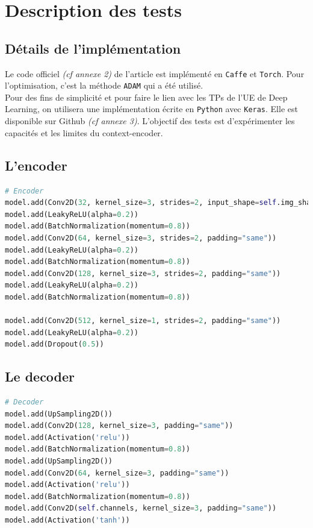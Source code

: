 \documentclass[11pt,a4paper]{article}
\begin{document}
            
    \section{Description des tests}
        \subsection{Détails de l'implémentation}
            Le code officiel \emph{(cf annexe 2)} de l’article est implémenté en \texttt{Caffe} et \texttt{Torch}. Pour l’optimisation, c’est la méthode \texttt{ADAM} qui a été utilisé.\\
            Pour des fins de simplicité et pour faire le lien avec les TPs de l’UE de Deep Learning, on utilisera une implémentation écrite en \texttt{Python} avec \texttt{Keras}. Elle est disponible sur Github \emph{(cf annexe 3)}. L'objectif des tests est d’expérimenter les capacités et les limites du context-encoder.
            
        \subsection{L'encoder}                
            \begin{lstlisting}[language=Python, caption=Code Python de l'encoder]
# Encoder
model.add(Conv2D(32, kernel_size=3, strides=2, input_shape=self.img_shape, https://www.xm1math.net/doculatex/listes.htmlpadding="same"))
model.add(LeakyReLU(alpha=0.2))
model.add(BatchNormalization(momentum=0.8))
model.add(Conv2D(64, kernel_size=3, strides=2, padding="same"))
model.add(LeakyReLU(alpha=0.2))
model.add(BatchNormalization(momentum=0.8))
model.add(Conv2D(128, kernel_size=3, strides=2, padding="same"))
model.add(LeakyReLU(alpha=0.2))
model.add(BatchNormalization(momentum=0.8))

model.add(Conv2D(512, kernel_size=1, strides=2, padding="same"))
model.add(LeakyReLU(alpha=0.2))
model.add(Dropout(0.5)) \end{lstlisting}
        
        \subsection{Le decoder}              
            \begin{lstlisting}[language=Python, caption=Code Python du decoder]
# Decoder
model.add(UpSampling2D())
model.add(Conv2D(128, kernel_size=3, padding="same"))
model.add(Activation('relu'))
model.add(BatchNormalization(momentum=0.8))
model.add(UpSampling2D())
model.add(Conv2D(64, kernel_size=3, padding="same"))
model.add(Activation('relu'))
model.add(BatchNormalization(momentum=0.8))
model.add(Conv2D(self.channels, kernel_size=3, padding="same"))
model.add(Activation('tanh'))\end{lstlisting}
\end{document}
